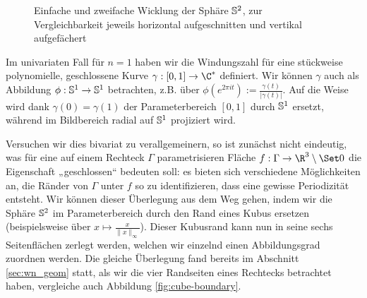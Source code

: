 \documentclass{mythesis}
\begin{document}
\begin{figure}[ht]
    \caption{Einfache und zweifache Wicklung der Sphäre $\S^2$, zur Vergleichbarkeit jeweils horizontal aufgeschnitten und vertikal aufgefächert}
    \label{fig:spherewinding}
\end{figure}

Im univariaten Fall für $n = 1$ haben wir die Windungszahl für eine stückweise polynomielle, geschlossene Kurve $\gamma: [0,1] \to \C^*$ definiert.
Wir können $\gamma$ auch als Abbildung $\phi: \S^1 \to \S^1$ betrachten, z.B. über $\phi(e^{2\pi i t}) := \frac{\gamma(t)}{|\gamma(t)|}$.
Auf die Weise wird dank $\gamma(0) = \gamma(1)$ der Parameterbereich $[0,1]$ durch $\S^1$ ersetzt, während im Bildbereich radial auf $\S^1$ projiziert wird.

Versuchen wir dies bivariat zu verallgemeinern, so ist zunächst nicht eindeutig, was für eine auf einem Rechteck $\Gamma$ parametrisieren Fläche $f: \Gamma \to \R^3 \setminus \Set 0$ die Eigenschaft „geschlossen“ bedeuten soll: es bieten sich verschiedene Möglichkeiten an, die Ränder von $\Gamma$ unter $f$ so zu identifizieren, dass eine gewisse Periodizität entsteht.
Wir können dieser Überlegung aus dem Weg gehen, indem wir die Sphäre $\S^2$ im Parameterbereich durch den Rand eines Kubus ersetzen (beispielsweise über $x \mapsto \frac{x}{\|x\|_\infty}$).
Dieser Kubusrand kann nun in seine sechs Seitenflächen zerlegt werden, welchen wir einzelnd einen Abbildungsgrad zuordnen werden.
Die gleiche Überlegung fand bereits im Abschnitt \ref{sec:wn_geom} statt, als wir die vier Randseiten eines Rechtecks betrachtet haben, vergleiche auch Abbildung \ref{fig:cube-boundary}.
\end{document}
